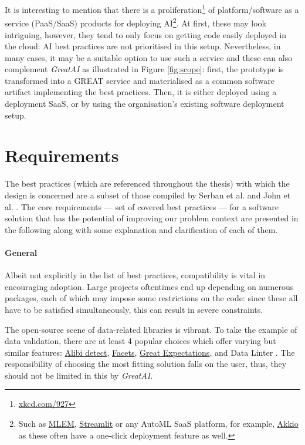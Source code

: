 It is interesting to mention that there is a proliferation\footnote{\href{https://xkcd.com/927/}{xkcd.com/927}} of platform/software as a service (PaaS/SaaS) products for deploying AI\footnote{Such as \href{https://mlem.ai/}{MLEM}, \href{https://streamlit.io/cloud}{Streamlit} or any AutoML SaaS platform, for example, \href{https://www.akkio.com/role/software-engineers}{Akkio} as these often have a one-click deployment feature as well.}. At first, these may look intriguing, however, they tend to only focus on getting code easily deployed in the cloud: AI best practices are not prioritised in this setup. Nevertheless, in many cases, it may be a suitable option to use such a service and these can also complement \textit{GreatAI} as illustrated in Figure \ref{fig:scope}: first, the prototype is transformed into a GREAT service and materialised as a common software artifact implementing the best practices. Then, it is either deployed using a deployment SaaS, or by using the organisation's existing software deployment setup.

\section{Requirements} \label{section:requirements}

The best practices (which are referenced throughout the thesis) with which the design is concerned are a subset of those compiled by Serban et al. \cite{serban2020adoption,serban2021practices} and John et al. \cite{john2020architecting}. The core requirements --- set of covered best practices --- for a software solution that has the potential of improving our problem context are presented in the following along with some explanation and clarification of each of them.

\paragraph{General} Albeit not explicitly in the list of best practices, compatibility is vital in encouraging adoption. Large projects oftentimes end up depending on numerous packages, each of which may impose some restrictions on the code: since these all have to be satisfied simultaneously, this can result in severe constraints. 

The open-source scene of data-related libraries is vibrant. To take the example of data validation, there are at least 4 popular choices which offer varying but similar features: \href{https://github.com/SeldonIO/alibi-detect}{Alibi detect}, \href{https://github.com/PAIR-code/facets}{Facets}, \href{https://github.com/great-expectations/great_expectations}{Great Expectations}, and Data Linter \cite{hynes2017data}. The responsibility of choosing the most fitting solution falls on the user, thus, they should not be limited in this by \textit{GreatAI}. 

